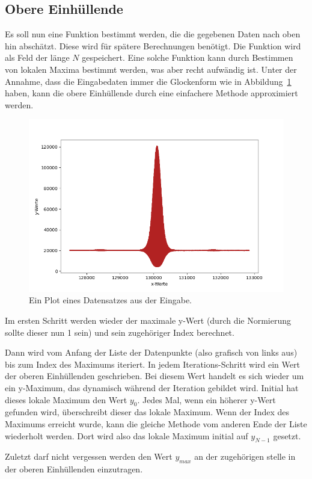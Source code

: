 \subsection{Obere Einhüllende}\label{subsec:ober-einh}
Es soll nun eine Funktion bestimmt werden, die die gegebenen Daten nach oben hin abschätzt.
Diese wird für spätere Berechnungen benötigt.
Die Funktion wird als Feld der länge $N$ gespeichert.
Eine solche Funktion kann durch Bestimmen von lokalen Maxima bestimmt werden, was aber recht aufwändig ist.
Unter der Annahme, dass die Eingabedaten immer die Glockenform wie in Abbildung~\ref{fig:eingabe-plot} haben, kann die obere Einhüllende durch eine einfachere Methode approximiert werden.
\begin{figure}[htb]
    \centering
    \includegraphics[width=0.8\linewidth]{images/EingabeInsgesamt}
    \caption{
        Ein Plot eines Datensatzes aus der Eingabe.
    }
    \label{fig:eingabe-plot}
\end{figure}

Im ersten Schritt werden wieder der maximale y-Wert (durch die Normierung sollte dieser nun 1 sein) und sein zugehöriger Index berechnet.

Dann wird vom Anfang der Liste der Datenpunkte (also grafisch von links aus) bis zum Index des Maximums iteriert.
In jedem Iterations-Schritt wird ein Wert der oberen Einhüllenden geschrieben.
Bei diesem Wert handelt es sich wieder um ein y-Maximum, das dynamisch während der Iteration gebildet wird.
Initial hat dieses lokale Maximum den Wert $y_0$.
Jedes Mal, wenn ein höherer y-Wert gefunden wird, überschreibt dieser das lokale Maximum.
Wenn der Index des Maximums erreicht wurde, kann die gleiche Methode vom anderen Ende der Liste wiederholt werden.
Dort wird also das lokale Maximum initial auf $y_{N-1}$ gesetzt.

Zuletzt darf nicht vergessen werden den Wert $y_{max}$ an der zugehörigen stelle in der oberen Einhüllenden einzutragen.

